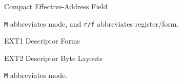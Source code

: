 \begin{manuallistedformatdiagram}{Compact Effective-Address Field}
\end{manuallistedformatdiagram}
{\small\texttt{M} abbreviates mode, and \texttt{r/f} abbreviates register/form.\par}

\begin{manuallistedformatdiagram}{EXT1 Descriptor Forms}
\end{manuallistedformatdiagram}

\begin{manuallistedformatdiagram}{EXT2 Descriptor Byte Layouts}
\end{manuallistedformatdiagram}
{\small\texttt{M} abbreviates mode.\par}
